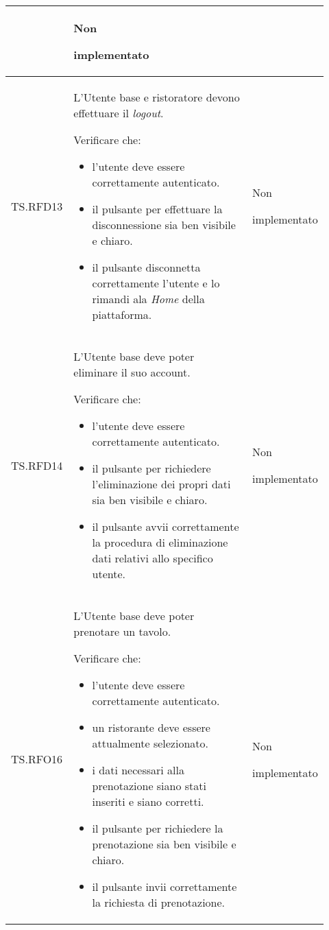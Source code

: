 \begin{longtable}{|p{0.10\linewidth}|p{0.70\linewidth}|p{0.12\linewidth}|}
\begin{itemize}
    \end{itemize}&
    Non \par implementato  \\
    \hline
    TS.RFD13 & 
    L'Utente base e ristoratore devono effettuare il \textit{logout}. \par 
    Verificare che: 
    \begin{itemize}
        \item l'utente deve essere correttamente autenticato.
        \item il pulsante per effettuare la disconnessione sia ben visibile e chiaro.
        \item il pulsante disconnetta correttamente l'utente e lo rimandi ala \textit{Home} della piattaforma.
    \end{itemize}&
    Non \par implementato  \\
    \hline
    TS.RFD14 & 
    L’Utente base deve poter eliminare il suo account. \par 
    Verificare che: 
    \begin{itemize}
        \item l'utente deve essere correttamente autenticato.
        \item il pulsante per richiedere l'eliminazione dei propri dati sia ben visibile e chiaro.
        \item il pulsante avvii correttamente la procedura di eliminazione dati relativi allo specifico utente.
    \end{itemize}&
    Non \par implementato  \\
    \hline
    TS.RFO16 & 
    L’Utente base deve poter prenotare un tavolo.  \par 
    Verificare che: 
    \begin{itemize}
        \item l'utente deve essere correttamente autenticato.
        \item un ristorante deve essere attualmente selezionato.
        \item i dati necessari alla prenotazione siano stati inseriti e siano corretti.
        \item il pulsante per richiedere la prenotazione sia ben visibile e chiaro.
        \item il pulsante invii correttamente la richiesta di prenotazione.
    \end{itemize}&
    Non \par implementato  \\

\end{longtable}
